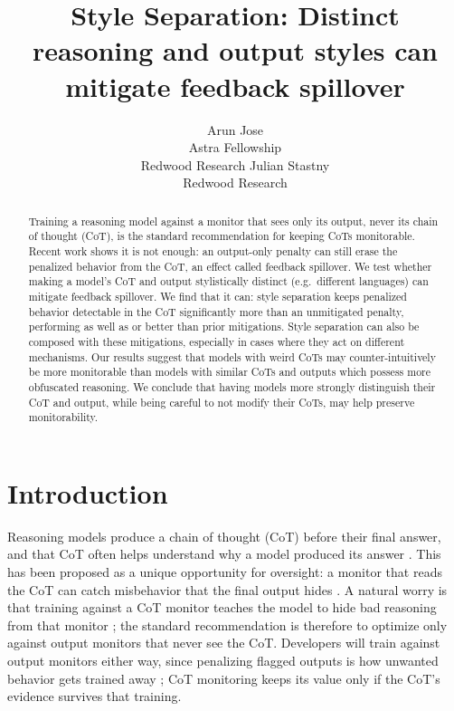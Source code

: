 \documentclass{article}
\title{Style Separation: Distinct reasoning and output styles can mitigate feedback spillover}
\author{%
  Arun Jose \\
  Astra Fellowship \\
  Redwood Research
  \And
  Julian Stastny \\
  Redwood Research
}
\begin{document}
\maketitle

\begin{abstract}
Training a reasoning model against a monitor that sees only its output, never its chain of thought (CoT), is the standard recommendation for keeping CoTs monitorable. Recent work shows it is not enough: an output-only penalty can still erase the penalized behavior from the CoT, an effect called feedback spillover. We test whether making a model's CoT and output stylistically distinct (e.g.\ different languages) can mitigate feedback spillover. We find that it can: style separation keeps penalized behavior detectable in the CoT significantly more than an unmitigated penalty, performing as well as or better than prior mitigations. Style separation can also be composed with these mitigations, especially in cases where they act on different mechanisms. Our results suggest that models with weird CoTs may counter-intuitively be more monitorable than models with similar CoTs and outputs which possess more obfuscated reasoning. We conclude that having models more strongly distinguish their CoT and output, while being careful to not modify their CoTs, may help preserve monitorability.
\end{abstract}

\section{Introduction}
\label{sec:intro}

Reasoning models produce a chain of thought (CoT) before their final answer, and that CoT often helps understand why a model produced its answer \citep{guo2025deepseek,korbak2025monitorability}. This has been proposed as a unique opportunity for oversight: a monitor that reads the CoT can catch misbehavior that the final output hides \citep{openai2024reasoning,baker2025monitoring,korbak2025monitorability}. A natural worry is that training against a CoT monitor teaches the model to hide bad reasoning from that monitor \citep{baker2025monitoring}; the standard recommendation is therefore to optimize only against output monitors that never see the CoT. Developers will train against output monitors either way, since penalizing flagged outputs is how unwanted behavior gets trained away \citep{anthropic2026mythosrisk}; CoT monitoring keeps its value only if the CoT's evidence survives that training.
\end{document}

